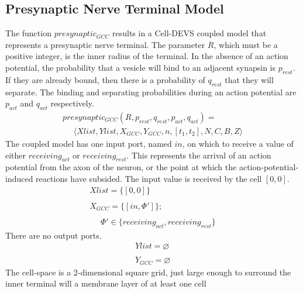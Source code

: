 \documentclass{acm_proc_article-sp}
\begin{document}
\subsection{Presynaptic Nerve Terminal Model}
The function $presynaptic_{GCC}$ results in a Cell-DEVS coupled model
that represents a presynaptic nerve terminal.
The parameter $R$, which must be a positive integer, is the inner 
radius of the terminal.  In the absence of an action potential, the 
probability that a vesicle will bind to an adjacent synapsin is 
$p_{rest}$.  If they are already bound, then there is a probability of 
$q_{rest}$ that they will separate.  The binding and separating 
probabilities during an action potential are $p_{act}$ and $q_{act}$
respectively. 
\begin{displaymath} \begin{array}{l}
presynaptic_{GCC}(R, p_{rest}, q_{rest}, p_{act}, q_{act}) = \\
\hspace{16pt} \langle Xlist, Ylist, X_{GCC}, Y_{GCC}, n, [t_1, t_2], N, C, B, Z \rangle 
\end{array} \end{displaymath}
The coupled model has one input port, named $in$, on which to receive
a value of either $receiving_{act}$ or $receiving_{rest}$.  This 
represents the arrival of an action potential from the axon of the
neuron, or the point at which the action-potential-induced reactions 
have subsided.  The input value is received by the cell $[0, 0]$. 
\begin{displaymath} \begin{array}{l}
Xlist = \{[0,0]\} \\
\\
X_{GCC} = \{[in, \Phi']\}; \\
\\
\hspace{16pt} \Phi' \in \{ receiving_{act}, receiving_{rest} \}
\end{array} \end{displaymath}
There are no output ports.
\begin{displaymath} \begin{array}{l}
Ylist = \varnothing \\
\\
Y_{GCC} = \varnothing
\end{array} \end{displaymath}
The cell-space is a 2-dimensional square grid, just large enough to 
surround the inner terminal will a membrane layer of at least one cell 
\end{document}
